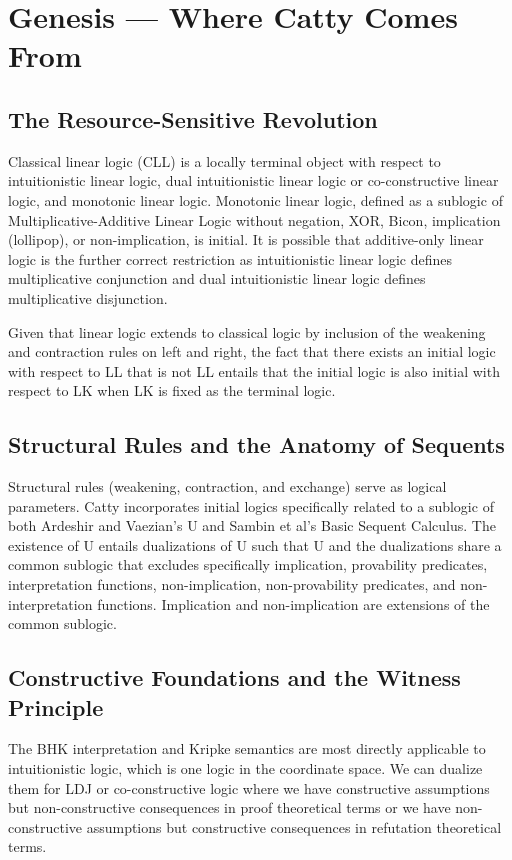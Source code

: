
\chapter*{Genesis --- Where Catty Comes From}

\section*{The Resource-Sensitive Revolution}
Classical linear logic (CLL) is a locally terminal object with respect to intuitionistic linear logic, dual intuitionistic linear logic or co-constructive linear logic, and monotonic linear logic. Monotonic linear logic, defined as a sublogic of Multiplicative-Additive Linear Logic without negation, XOR, Bicon, implication (lollipop), or non-implication, is initial. It is possible that additive-only linear logic is the further correct restriction as intuitionistic linear logic defines multiplicative conjunction and dual intuitionistic linear logic defines multiplicative disjunction.

Given that linear logic extends to classical logic by inclusion of the weakening and contraction rules on left and right, the fact that there exists an initial logic with respect to LL that is not LL entails that the initial logic is also initial with respect to LK when LK is fixed as the terminal logic.

\section*{Structural Rules and the Anatomy of Sequents}
Structural rules (weakening, contraction, and exchange) serve as logical parameters. Catty incorporates initial logics specifically related to a sublogic of both Ardeshir and Vaezian's U and Sambin et al's Basic Sequent Calculus. The existence of U entails dualizations of U such that U and the dualizations share a common sublogic that excludes specifically implication, provability predicates, interpretation functions, non-implication, non-provability predicates, and non-interpretation functions. Implication and non-implication are extensions of the common sublogic.

\section*{Constructive Foundations and the Witness Principle}
The BHK interpretation and Kripke semantics are most directly applicable to intuitionistic logic, which is one logic in the coordinate space. We can dualize them for LDJ or co-constructive logic where we have constructive assumptions but non-constructive consequences in proof theoretical terms or we have non-constructive assumptions but constructive consequences in refutation theoretical terms.

